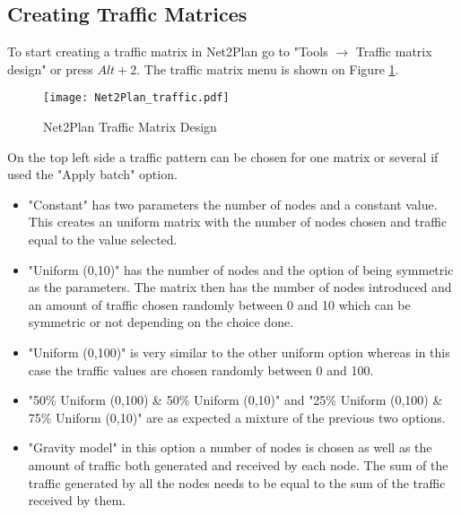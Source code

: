 \documentclass[12pt, a4paper]{article}
\begin{document}
	\subsection{Creating Traffic Matrices}
    To start creating a traffic matrix in Net2Plan go to "Tools $\rightarrow$ Traffic matrix design" or press $Alt+2$. The traffic matrix menu is shown on Figure \ref{Net2Plan_traffic}.
	
	\begin{figure}[h!]
		\vspace{-0.3cm}
		\centering	
		\texttt{[image: Net2Plan\_traffic.pdf]}
		\caption{Net2Plan Traffic Matrix Design}
		\label{Net2Plan_traffic}
	\end{figure}
		
	\vspace{-0.3cm}
	
	On the top left side a traffic pattern can be chosen for one matrix or several if used the "Apply batch" option.
	
	\begin{itemize}	
		
		\item{"Constant" has two parameters the number of nodes and a constant value. This creates an uniform matrix with the number of nodes chosen and traffic equal to the value selected.}
	
		\item{"Uniform (0,10)" has the number of nodes and the option of being symmetric as the parameters. The matrix then has the number of nodes introduced and an amount of traffic chosen randomly between 0 and 10 which can be symmetric or not depending on the choice done.}
	
		\item{"Uniform (0,100)" is very similar to the other uniform option whereas in this case the traffic values are chosen randomly between 0 and 100.}
	
		\item{"50\% Uniform (0,100) \& 50\% Uniform (0,10)" and "25\% Uniform (0,100) \& 75\% Uniform (0,10)" are as expected a mixture of the previous two options.}
	
		\item{"Gravity model" in this option a number of nodes is chosen as well as the amount of traffic both generated and received by each node. The sum of the traffic generated by all the nodes needs to be equal to the sum of the traffic received by them. }

	\end{itemize}
	
\end{document}
